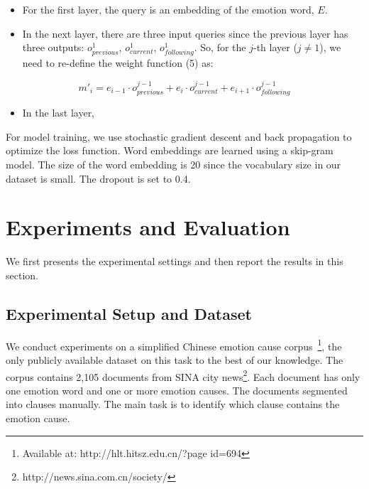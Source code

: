 \documentclass[11pt,letterpaper]{article}
\begin{document}
\begin{CJK*}{UTF8}{gbsn}
\begin{itemize}
\item For the first layer, the query is an embedding of the emotion word, $E$.
\item In the next layer, there are three input queries since the previous layer has three outputs: $o^1_{previous}$, $o^1_{current}$, $o^1_{following}$. So, for the $j$-th layer ($j \not= 1$), we need to re-define the weight function (5) as:
\end{itemize}

\begin{equation}
m'_i = e_{i-1} \cdot o^{j-1}_{previous} + e_{i} \cdot o^{j-1}_{current} + e_{i+1} \cdot o^{j-1}_{following} 
\end{equation}

\begin{itemize}
\item In the last layer, 
\end{itemize}

For model training, we use stochastic gradient descent and back propagation to optimize the loss function. Word embeddings are learned using a skip-gram model. The size of the word embedding is 20 since the vocabulary size in our dataset is small. The dropout is set to 0.4.

\section{Experiments and Evaluation}
\label{sec:section4}

We first presents the experimental settings and then report the results in this section.

\subsection{Experimental Setup and Dataset}

We conduct experiments on a simplified Chinese emotion cause corpus~\cite{gui2016event}\footnote{Available at: http://hlt.hitsz.edu.cn/?page id=694}, 
the only publicly available dataset on this task to the best of our knowledge. The corpus contains 2,105 documents from SINA city news\footnote{http://news.sina.com.cn/society/}. Each document has only one emotion word and one or more emotion causes. The documents  segmented into clauses manually. The main task is to identify which clause contains the emotion cause.


\end{CJK*}
\end{document}
